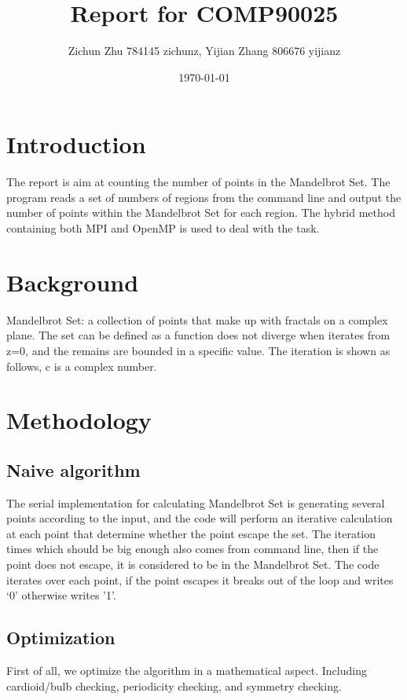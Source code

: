 \documentclass[letterpaper,10pt]{article}
\begin{document}
\title{Report for COMP90025}
\author{Zichun Zhu 784145 zichunz, Yijian Zhang 806676 yijianz }
\date{\today}
\maketitle

\section{Introduction}
The report is aim at counting the number of points in the Mandelbrot Set. The program reads a set of numbers of regions from the command line and output the number of points within the Mandelbrot Set for each region. The hybrid method containing both MPI and OpenMP is used to deal with the task.

\section{Background}
Mandelbrot Set: a collection of points that make up with fractals on a complex plane. The set can be defined as a function does not diverge when iterates from z=0, and the remains are bounded in a specific value. The iteration is shown as follows, c is a complex number.

\section{Methodology}
\subsection{Naive algorithm}
The serial implementation for calculating Mandelbrot Set is generating several points according to the input, and the code will perform an iterative calculation at each point that determine whether the point escape the set. The iteration times which should be big enough also comes from command line, then if the point does not escape, it is considered to be in the Mandelbrot Set. The code iterates over each point, if the point escapes it breaks out of the loop and writes ‘0’ otherwise writes ’1’.

\subsection{Optimization}
First of all, we optimize the algorithm in a mathematical aspect. Including cardioid/bulb checking, periodicity checking, and symmetry checking.
\end{document}
